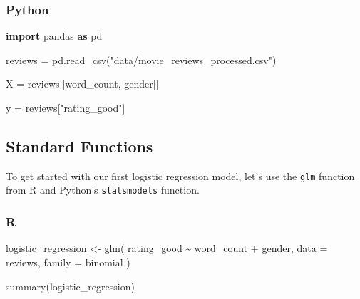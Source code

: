 \documentclass[
  letterpaper,
]{krantz}
\newenvironment{Shaded}{}{}
\newcommand{\AttributeTok}[1]{\textcolor[rgb]{0.49,0.56,0.16}{#1}}
\newcommand{\FunctionTok}[1]{\textcolor[rgb]{0.02,0.16,0.49}{#1}}
\newcommand{\ImportTok}[1]{\textcolor[rgb]{0.00,0.50,0.00}{\textbf{#1}}}
\newcommand{\NormalTok}[1]{#1}
\newcommand{\OperatorTok}[1]{\textcolor[rgb]{0.40,0.40,0.40}{#1}}
\newcommand{\OtherTok}[1]{\textcolor[rgb]{0.00,0.44,0.13}{#1}}
\newcommand{\SpecialCharTok}[1]{\textcolor[rgb]{0.25,0.44,0.63}{#1}}
\newcommand{\StringTok}[1]{\textcolor[rgb]{0.25,0.44,0.63}{#1}}
\begin{document}
\subsubsection{Python}

\begin{Shaded}
\begin{Highlighting}[]
\ImportTok{import}\NormalTok{ pandas }\ImportTok{as}\NormalTok{ pd}

\NormalTok{reviews }\OperatorTok{=}\NormalTok{ pd.read\_csv(}\StringTok{"data/movie\_reviews\_processed.csv"}\NormalTok{)}
\end{Highlighting}
\end{Shaded}

\begin{Shaded}
\begin{Highlighting}[]
\NormalTok{X }\OperatorTok{=}\NormalTok{ reviews[[}\StringTok{\textquotesingle{}word\_count\textquotesingle{}}\NormalTok{, }\StringTok{\textquotesingle{}gender\textquotesingle{}}\NormalTok{]]}

\NormalTok{y }\OperatorTok{=}\NormalTok{ reviews[}\StringTok{"rating\_good"}\NormalTok{]}
\end{Highlighting}
\end{Shaded}

\subsection{Standard Functions}\label{standard-functions}

To get started with our first logistic regression model, let's use the
\texttt{glm} function from R and Python's \texttt{statsmodels} function.

\subsubsection{R}

\begin{Shaded}
\begin{Highlighting}[]
\NormalTok{logistic\_regression }\OtherTok{\textless{}{-}} \FunctionTok{glm}\NormalTok{(}
\NormalTok{    rating\_good }\SpecialCharTok{\textasciitilde{}}\NormalTok{ word\_count }\SpecialCharTok{+}\NormalTok{ gender, }
    \AttributeTok{data =}\NormalTok{ reviews,}
    \AttributeTok{family =}\NormalTok{ binomial}
\NormalTok{)}

\FunctionTok{summary}\NormalTok{(logistic\_regression)}
\end{Highlighting}
\end{Shaded}
\end{document}

